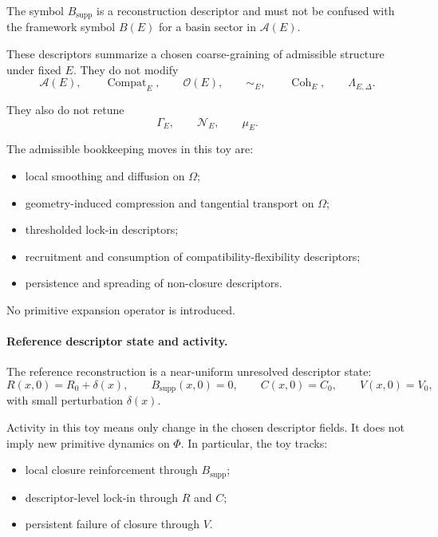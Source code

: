 \documentclass[aps,prx,onecolumn,11pt]{revtex4-2}
\theoremstyle{plain}
\theoremstyle{definition}
\theoremstyle{remark}
\newcommand{\Compat}{\operatorname{Compat}} %
\newcommand{\Coh}{\operatorname{Coh}}       %
\begin{document}
The symbol \(B_{\mathrm{supp}}\) is a reconstruction descriptor and
must not be confused with the framework symbol \(B(E)\) for a basin
sector in \(\mathcal A(E)\).

These descriptors summarize a chosen coarse-graining of admissible
structure under fixed \(E\). They do not modify
\[
\mathcal A(E),
\qquad
\Compat_E,
\qquad
\mathcal O(E),
\qquad
\sim_E,
\qquad
\Coh_E,
\qquad
\Lambda_{E,\Delta}.
\]

They also do not retune
\[
\Gamma_E,
\qquad
\mathcal N_E,
\qquad
\mu_E.
\]

The admissible bookkeeping moves in this toy are:

\begin{itemize}
\item local smoothing and diffusion on \(\Omega\);
\item geometry-induced compression and tangential transport on
\(\Omega\);
\item thresholded lock-in descriptors;
\item recruitment and consumption of compatibility-flexibility
descriptors;
\item persistence and spreading of non-closure descriptors.
\end{itemize}

No primitive expansion operator is introduced.

\paragraph{Reference descriptor state and activity.}

The reference reconstruction is a near-uniform unresolved descriptor
state:
\begin{equation}
R(x,0)
=
R_0+\delta(x),
\qquad
B_{\mathrm{supp}}(x,0)=0,
\qquad
C(x,0)=C_0,
\qquad
V(x,0)=V_0,
\label{eq:toy_sep_initial_state}
\end{equation}
with small perturbation \(\delta(x)\).

Activity in this toy means only change in the chosen descriptor fields.
It does not imply new primitive dynamics on \(\Phi\). In particular,
the toy tracks:

\begin{itemize}
\item local closure reinforcement through \(B_{\mathrm{supp}}\);
\item descriptor-level lock-in through \(R\) and \(C\);
\item persistent failure of closure through \(V\).
\end{itemize}
\end{document}
